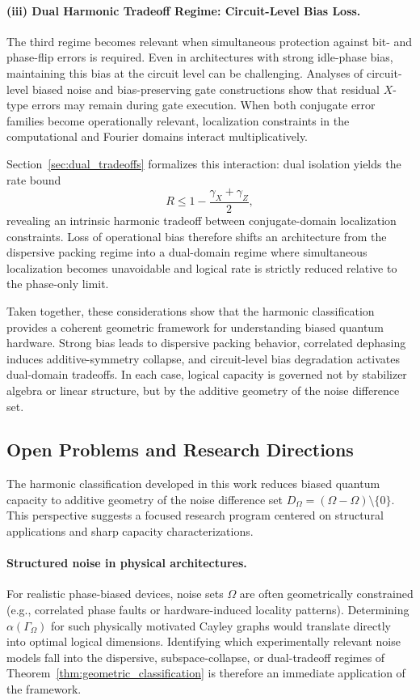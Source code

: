 \documentclass[a4paper,twocolumn,11pt,allowtoday]{quantumarticle}
\theoremstyle{plain}
\theoremstyle{definition}
\theoremstyle{remark}
\begin{document}
\paragraph{(iii) Dual Harmonic Tradeoff Regime: Circuit-Level Bias Loss.}

The third regime becomes relevant when simultaneous protection against bit- and phase-flip errors is required. Even in architectures with strong idle-phase bias, maintaining this bias at the circuit level can be challenging. Analyses of circuit-level biased noise and bias-preserving gate constructions \cite{Puri2020, EtxezarretaMartinez2024} show that residual $X$-type errors may remain during gate execution. When both conjugate error families become operationally relevant, localization constraints in the computational and Fourier domains interact multiplicatively.

Section~\ref{sec:dual_tradeoffs} formalizes this interaction: dual isolation yields the rate bound
\[
R \le 1 - \frac{\gamma_X+\gamma_Z}{2},
\]
revealing an intrinsic harmonic tradeoff between conjugate-domain localization constraints. Loss of operational bias therefore shifts an architecture from the dispersive packing regime into a dual-domain regime where simultaneous localization becomes unavoidable and logical rate is strictly reduced relative to the phase-only limit.

\medskip

Taken together, these considerations show that the harmonic classification provides a coherent geometric framework for understanding biased quantum hardware. Strong bias leads to dispersive packing behavior, correlated dephasing induces additive-symmetry collapse, and circuit-level bias degradation activates dual-domain tradeoffs. In each case, logical capacity is governed not by stabilizer algebra or linear structure, but by the additive geometry of the noise difference set.
\subsection{Open Problems and Research Directions}
\label{subsec:open_problems}

The harmonic classification developed in this work reduces biased quantum capacity to additive geometry of the noise difference set $D_\Omega = (\Omega-\Omega)\setminus\{0\}$. This perspective suggests a focused research program centered on structural applications and sharp capacity characterizations.

\paragraph{Structured noise in physical architectures.}
For realistic phase-biased devices, noise sets $\Omega$ are often geometrically constrained (e.g., correlated phase faults or hardware-induced locality patterns). Determining $\alpha(\Gamma_\Omega)$ for such physically motivated Cayley graphs would translate directly into optimal logical dimensions. Identifying which experimentally relevant noise models fall into the dispersive, subspace-collapse, or dual-tradeoff regimes of Theorem~\ref{thm:geometric_classification} is therefore an immediate application of the framework.
\end{document}
